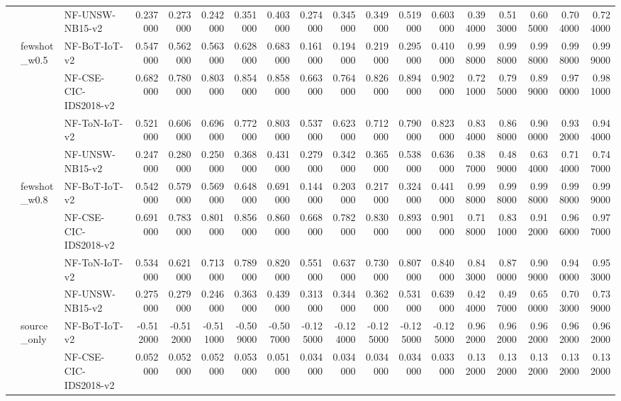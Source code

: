 \begin{tabular}{lllrrrrrrrrrrrrrrr}
 &  & NF-UNSW-NB15-v2 & 0.237000 & 0.273000 & 0.242000 & 0.351000 & 0.403000 & 0.274000 & 0.345000 & 0.349000 & 0.519000 & 0.603000 & 0.394000 & 0.513000 & 0.605000 & 0.704000 & 0.724000 \\
\cline{2-18}
 & \multirow[t]{4}{*}{fewshot_w0.5} & NF-BoT-IoT-v2 & 0.547000 & 0.562000 & 0.563000 & 0.628000 & 0.683000 & 0.161000 & 0.194000 & 0.219000 & 0.295000 & 0.410000 & 0.998000 & 0.998000 & 0.998000 & 0.998000 & 0.999000 \\
 &  & NF-CSE-CIC-IDS2018-v2 & 0.682000 & 0.780000 & 0.803000 & 0.854000 & 0.858000 & 0.663000 & 0.764000 & 0.826000 & 0.894000 & 0.902000 & 0.721000 & 0.795000 & 0.899000 & 0.970000 & 0.981000 \\
 &  & NF-ToN-IoT-v2 & 0.521000 & 0.606000 & 0.696000 & 0.772000 & 0.803000 & 0.537000 & 0.623000 & 0.712000 & 0.790000 & 0.823000 & 0.834000 & 0.868000 & 0.900000 & 0.932000 & 0.944000 \\
 &  & NF-UNSW-NB15-v2 & 0.247000 & 0.280000 & 0.250000 & 0.368000 & 0.431000 & 0.279000 & 0.342000 & 0.365000 & 0.538000 & 0.636000 & 0.387000 & 0.489000 & 0.634000 & 0.714000 & 0.747000 \\
\cline{2-18}
 & \multirow[t]{4}{*}{fewshot_w0.8} & NF-BoT-IoT-v2 & 0.542000 & 0.579000 & 0.569000 & 0.648000 & 0.691000 & 0.144000 & 0.203000 & 0.217000 & 0.324000 & 0.441000 & 0.998000 & 0.998000 & 0.998000 & 0.998000 & 0.999000 \\
 &  & NF-CSE-CIC-IDS2018-v2 & 0.691000 & 0.783000 & 0.801000 & 0.856000 & 0.860000 & 0.668000 & 0.782000 & 0.830000 & 0.893000 & 0.901000 & 0.718000 & 0.831000 & 0.912000 & 0.966000 & 0.977000 \\
 &  & NF-ToN-IoT-v2 & 0.534000 & 0.621000 & 0.713000 & 0.789000 & 0.820000 & 0.551000 & 0.637000 & 0.730000 & 0.807000 & 0.840000 & 0.843000 & 0.870000 & 0.909000 & 0.940000 & 0.953000 \\
 &  & NF-UNSW-NB15-v2 & 0.275000 & 0.279000 & 0.246000 & 0.363000 & 0.439000 & 0.313000 & 0.344000 & 0.362000 & 0.531000 & 0.639000 & 0.424000 & 0.497000 & 0.650000 & 0.703000 & 0.739000 \\
\cline{2-18}
 & \multirow[t]{4}{*}{source_only} & NF-BoT-IoT-v2 & -0.512000 & -0.512000 & -0.511000 & -0.509000 & -0.507000 & -0.125000 & -0.124000 & -0.125000 & -0.125000 & -0.125000 & 0.962000 & 0.962000 & 0.962000 & 0.962000 & 0.962000 \\
 &  & NF-CSE-CIC-IDS2018-v2 & 0.052000 & 0.052000 & 0.052000 & 0.053000 & 0.051000 & 0.034000 & 0.034000 & 0.034000 & 0.034000 & 0.033000 & 0.132000 & 0.132000 & 0.132000 & 0.132000 & 0.132000 \\

\end{tabular}
